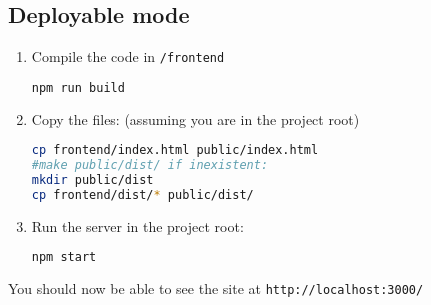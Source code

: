 \documentclass[a4paper]{article}
\begin{document}
\subsection{Deployable mode}
\begin{enumerate}
\item Compile the code in \texttt{/frontend}
\begin{lstlisting}[language=bash]
npm run build
\end{lstlisting}
\item Copy the files: (assuming you are in the project root)
\begin{lstlisting}[language=bash]
cp frontend/index.html public/index.html
#make public/dist/ if inexistent:
mkdir public/dist
cp frontend/dist/* public/dist/
\end{lstlisting} 
\item Run the server in the project root:
\begin{lstlisting}[language=bash]
npm start
\end{lstlisting}
\end{enumerate}
You should now be able to see the site at \texttt{http://localhost:3000/}
\end{document}
